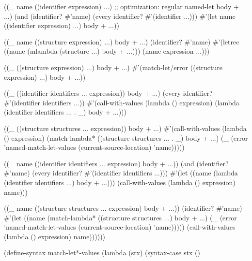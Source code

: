 \begin{Snippet}
      ((_ name ((identifier expression) ...) ;; optimization: regular named-let
	  body + ...)
       (and (identifier? #'name) (every identifier? #'(identifier ...)))
       #'(let name ((identifier expression) ...)
	  body + ...))
\end{Snippet}
\begin{Snippet}
      ((_ name ((structure expression) ...)
	  body + ...)
       (identifier? #'name)
       #'(letrec ((name (mlambda (structure ...) body + ...)))
	   (name expression ...)))
\end{Snippet}
\begin{Snippet}
      ((_ ((structure expression) ...)
	  body + ...)
       #'(match-let/error ((structure expression) ...) 
			  body + ...))
\end{Snippet}
\begin{Snippet}
      ((_ ((identifier identifiers ... expression)) body + ...)
       (every identifier? #'(identifier identifiers ...))
       #'(call-with-values (lambda () expression)
	   (lambda (identifier identifiers ... . _)
	     body + ...)))
\end{Snippet}
\begin{Snippet}
      ((_ ((structure structures ... expression)) body + ...)
       #'(call-with-values (lambda () expression)
	   (match-lambda* 
	       ((structure structures ... . _) body + ...)
	     (_ (error 'named-match-let-values 
		       (current-source-location)
		       'name)))))
\end{Snippet}
\begin{Snippet}
      ((_ name ((identifier identifiers ... expression) body + ...))
       (and (identifier? #'name)
	    (every identifier? #'(identifier identifiers ...)))
       #'(let ((name (lambda (identifier identifiers ...) body + ...)))
	   (call-with-values (lambda () expression) name)))
\end{Snippet}
\begin{Snippet}
      ((_ name ((structure structures ... expression) body + ...))
       (identifier? #'name)
       #'(let ((name (match-lambda* ((structure structures ...) body + ...)
		       (_ (error 'named-match-let-values
				 (current-source-location)
				 'name)))))
	   (call-with-values (lambda () expression) name))))))
\end{Snippet}
\begin{Snippet}
(define-syntax match-let*-values
  (lambda (stx)
    (syntax-case stx ()
\end{Snippet}
